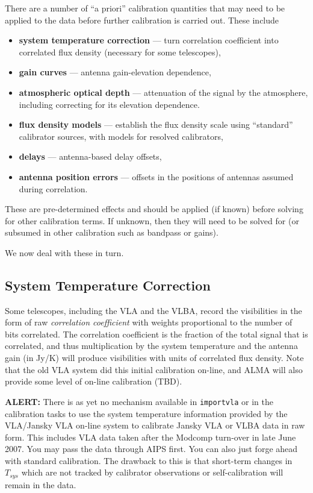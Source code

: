 There are a number of ``a priori'' calibration quantities that
may need to be applied to the data before further calibration
is carried out.  These include
\begin{itemize}
   \item {\bf system temperature correction} --- turn correlation
      coefficient into correlated flux density (necessary for some
      telescopes),
   \item {\bf gain curves} --- antenna gain-elevation dependence,
   \item {\bf atmospheric optical depth} --- attenuation of the signal
      by the atmosphere, including correcting for its elevation dependence.
   \item {\bf flux density models} --- establish the flux density
      scale using ``standard'' calibrator sources, with models for
      resolved calibrators,
   \item {\bf delays} --- antenna-based delay offsets,
   \item {\bf antenna position errors} --- offsets in the positions of
      antennas assumed during correlation.
\end{itemize}
These are pre-determined effects and should be applied (if known) before
solving for other calibration terms.  If unknown, then they will
need to be solved for (or subsumed in other calibration such as 
bandpass or gains).

We now deal with these in turn.

\subsection{System Temperature Correction}
\label{section:cal.prior.tsys}

Some telescopes, including the VLA and the VLBA, record the
visibilities in the form of raw {\it correlation coefficient} 
with weights proportional to the number of bits correlated.
The correlation coefficient is the fraction of the total signal
that is correlated, and thus multiplication by the system temperature
and the antenna gain (in Jy/K) will produce visibilities with
units of correlated flux density.  Note that the old VLA system did
this initial calibration on-line, and ALMA will also provide some
level of on-line calibration (TBD).

{\bf ALERT:} There is as yet no mechanism available in {\tt importvla}
or in the calibration tasks to use the system temperature information
provided by the VLA/Jansky VLA on-line system to calibrate Jansky VLA or VLBA data
in raw form.  This includes VLA data taken after the Modcomp turn-over
in late June 2007.  You may pass the data through AIPS first.  You can
also just forge ahead with standard calibration.  The drawback to this
is that short-term changes in $T_{sys}$ which are not tracked by
calibrator observations or self-calibration will remain in the data.

